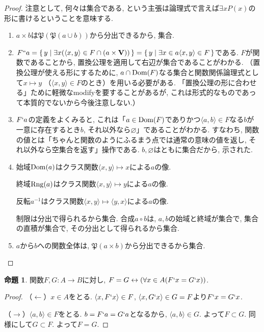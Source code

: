 \documentclass[a4paper, twoside]{bxjsarticle}
\theoremstyle{definition}
\newtheorem{prop}[thm]{命題}
\begin{document}
        \begin{proof}
            注意として, 何々は集合である, という主張は論理式で言えば$\exists x P(x)$の形に書けるということを意味する. 
            \begin{enumerate}
                \item $a\times b$は$\mathfrak{P}(\mathfrak{P}(a\cup b))$から分出できるから, 集合.
                \item $F``a = \set{y|\exists x (\langle x, y\rangle \in F\cap (a\times \textbf{V}))} = \set{y|\exists x\in a \langle x, y\rangle \in F}$である. $F$が関数であることから, 置換公理を適用して右辺が集合であることがわかる. （置換公理が使える形にするために, $a\cap {\rm Dom}(F)$なる集合と関数関係論理式として$x\mapsto y$ （$\langle x, y\rangle \in F$のとき）を用いる必要がある. 「置換公理の形に合わせる」ために軽微なmodifyを要することがあるが, これは形式的なものであって本質的でないから今後注意しない.）
                \item $F`a$の定義をよくみると, これは「$a\in {\rm Dom}(F)$でありかつ$\langle a, b\rangle\in F$なる$b$が一意に存在するとき$b$, それ以外なら$\varnothing$」であることがわかる. すなわち, 関数の値とは「ちゃんと関数のようにふるまう点では通常の意味の値を返し, それ以外なら空集合を返す」操作である. $b, \varnothing$はともに集合だから, 示された.
                \item 始域${\rm Dom}(a)$はクラス関数$\langle x, y\rangle \mapsto x$による$a$の像.
                
                終域${\rm Rng}(a)$はクラス関数$\langle x, y\rangle \mapsto y$による$a$の像.
                
                反転$a^{-1}$はクラス関数$\langle x, y\rangle \mapsto \langle y, x\rangle$による$a$の像.
                
                制限は分出で得られるから集合. 合成$a\circ b$は, $a, b$の始域と終域が集合で, 集合の直積が集合で, その分出として得られるから集合.
                
                \item $a$から$b$への関数全体は, $\mathfrak{P}(a\times b)$から分出できるから集合.
            \end{enumerate}
        \end{proof}
        \begin{prop}
            関数$F, G\colon A\to B$に対し, $F=G \leftrightarrow (\forall x\in A (F`x = G`x))$.
        \end{prop}
        \begin{proof}
            （$\leftarrow$）$x\in A$をとる. $\langle x, F`x\rangle \in F$, $\langle x, G`x\rangle \in G=F$より$F`x = G`x$.
            
            （$\rightarrow$）$\langle a, b\rangle \in F$をとる. $b=F`a=G`a$となるから, $\langle a, b\rangle \in G$. よって$F\subset G$. 同様にして$G\subset F$. よって$F=G$.
        \end{proof}
\end{document}
